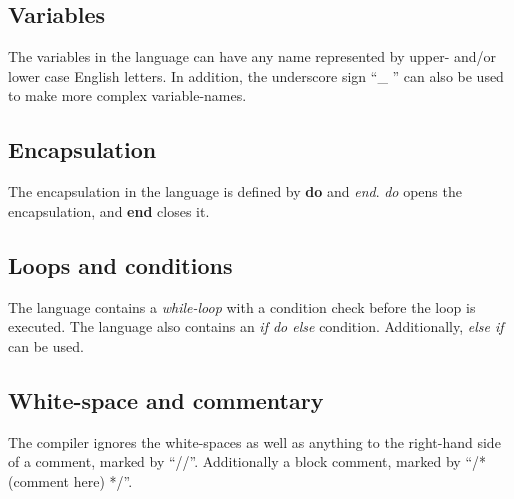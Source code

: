 \subsection{Variables}
The variables in the language can have any name represented by upper- and/or lower case English letters. In addition, the underscore sign ``\_ '' can also be used to make more complex variable-names. 

\subsection{Encapsulation}
The encapsulation in the language is defined by \textbf{do} and \textit{end}. \textit{do} opens the encapsulation, and \textbf{end} closes it.   

\subsection{Loops and conditions}
The language contains a \textit{while-loop} with a condition check before the loop is executed. The language also contains an \textit{if do else} condition. Additionally, \textit{else if} can be used.   

\subsection{White-space and commentary}
The compiler ignores the white-spaces as well as anything to the right-hand side of a comment, marked by ``//''. Additionally a block comment, marked by ``/* (comment here) */''.


